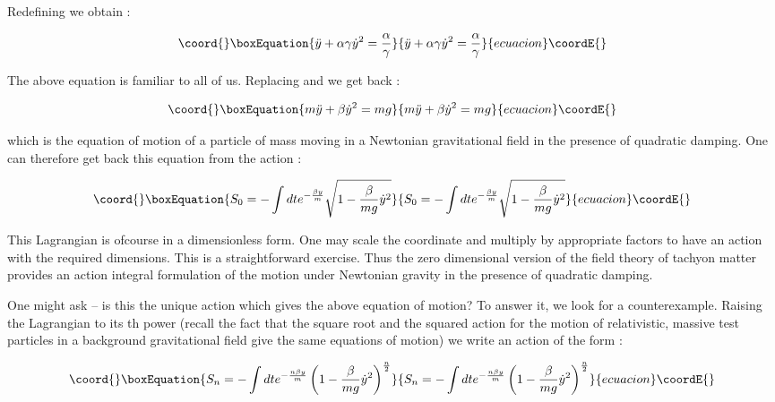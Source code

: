 \documentclass[a4paper,prd,aps,twocolumn]{revtex4}
\begin{document}
{Redefining \coordHE{} we obtain :

\begin{equation}\coord{}\boxEquation{ 
\ddot y +\alpha \gamma {\dot y}^2 = \frac{\alpha}{\gamma}
}{ 
\ddot y +\alpha \gamma {\dot y}^2 = \frac{\alpha}{\gamma}
}{ecuacion}\coordE{}\end{equation}

The above equation is familiar to all of us.
Replacing \coordHE{} and \coordHE{}
we get back :

\begin{equation}\coord{}\boxEquation{
m\ddot y + \beta {\dot y}^2 = mg
}{
m\ddot y + \beta {\dot y}^2 = mg
}{ecuacion}\coordE{}\end{equation}

which is the equation of motion of a particle of mass \coordHE{} moving in a
Newtonian gravitational field in the presence of quadratic damping. One can
therefore get back this equation from the action :

\begin{equation}\coord{}\boxEquation{
S_0 = -\int dt e^{-\frac{\beta y}{m}} \sqrt{1-\frac{\beta}{mg}{\dot y}^2}
}{
S_0 = -\int dt e^{-\frac{\beta y}{m}} \sqrt{1-\frac{\beta}{mg}{\dot y}^2}
}{ecuacion}\coordE{}\end{equation}

This Lagrangian is ofcourse in a dimensionless form. One may scale the
coordinate and multiply by appropriate factors to have an action with
the required dimensions. This is a straightforward exercise.
Thus the zero dimensional version of the field theory of tachyon matter
provides an action integral formulation of the motion under Newtonian
gravity  in the presence of quadratic damping.

One might ask -- is this the unique action which gives the above equation of
motion? To answer it, we look for a counterexample. Raising the Lagrangian
to its \coordHE{}th power (recall the fact that the square root and the squared
action for the motion of relativistic, massive test particles in a 
background gravitational
field give the same equations of motion)  we write an action of the form :

\begin{equation}\coord{}\boxEquation{
S_n = -\int dt e^{-\frac{n\beta y}{m}} \left (1-\frac{\beta}{mg}{\dot y}^2
\right )^{\frac{n}{2}}
}{
S_n = -\int dt e^{-\frac{n\beta y}{m}} \left (1-\frac{\beta}{mg}{\dot y}^2
\right )^{\frac{n}{2}}
}{ecuacion}\coordE{}\end{equation}

}
\end{document}
